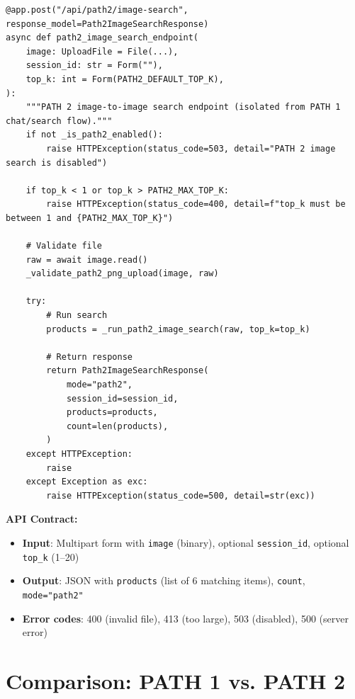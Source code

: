 \documentclass[12pt, twoside]{report}
\begin{document}
\begin{lstlisting}[caption={FastAPI PATH 2 Endpoint --- api/main.py}]
@app.post("/api/path2/image-search", response_model=Path2ImageSearchResponse)
async def path2_image_search_endpoint(
    image: UploadFile = File(...),
    session_id: str = Form(""),
    top_k: int = Form(PATH2_DEFAULT_TOP_K),
):
    """PATH 2 image-to-image search endpoint (isolated from PATH 1 chat/search flow)."""
    if not _is_path2_enabled():
        raise HTTPException(status_code=503, detail="PATH 2 image search is disabled")
    
    if top_k < 1 or top_k > PATH2_MAX_TOP_K:
        raise HTTPException(status_code=400, detail=f"top_k must be between 1 and {PATH2_MAX_TOP_K}")
    
    # Validate file
    raw = await image.read()
    _validate_path2_png_upload(image, raw)
    
    try:
        # Run search
        products = _run_path2_image_search(raw, top_k=top_k)
        
        # Return response
        return Path2ImageSearchResponse(
            mode="path2",
            session_id=session_id,
            products=products,
            count=len(products),
        )
    except HTTPException:
        raise
    except Exception as exc:
        raise HTTPException(status_code=500, detail=str(exc))
\end{lstlisting}

\textbf{API Contract:}
\begin{itemize}
    \item \textbf{Input}: Multipart form with \texttt{image} (binary), optional \texttt{session\_id}, optional \texttt{top\_k} (1--20)
    \item \textbf{Output}: JSON with \texttt{products} (list of 6 matching items), \texttt{count}, \texttt{mode="path2"}
    \item \textbf{Error codes}: 400 (invalid file), 413 (too large), 503 (disabled), 500 (server error)
\end{itemize}

\section{Comparison: PATH 1 vs. PATH 2}
\end{document}
